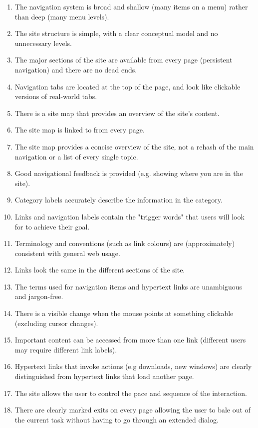 \begin{itemize}
\begin{enumerate}
        \item The navigation system is broad and shallow (many items on a menu) rather than deep (many menu levels).
        \item The site structure is simple, with a clear conceptual model and no unnecessary levels.
        \item The major sections of the site are available from every page (persistent navigation) and there are no dead ends.
        \item Navigation tabs are located at the top of the page, and look like clickable versions of real-world tabs.
        \item There is a site map that provides an overview of the site's content.
        \item The site map is linked to from every page.
        \item The site map provides a concise overview of the site, not a rehash of the main navigation or a list of every single topic.
        \item Good navigational feedback is provided (e.g. showing where you are in the site).
        \item Category labels accurately describe the information in the category.
        \item Links and navigation labels contain the "trigger words" that users will look for to achieve their goal.
        \item Terminology and conventions (such as link colours) are (approximately) consistent with general web usage.
        \item Links look the same in the different sections of the site.
        \item The terms used for navigation items and hypertext links are unambiguous and jargon-free.
        \item There is a visible change when the mouse points at something clickable (excluding cursor changes).
        \item Important content can be accessed from more than one link (different users may require different link labels).
        \item Hypertext links that invoke actions (e.g downloads, new windows) are clearly distinguished from hypertext links that load another page.
        \item The site allows the user to control the pace and sequence of the interaction.
        \item There are clearly marked exits on every page allowing the user to bale out of the current task without having to go through an extended dialog.

\end{enumerate}
\end{itemize}
